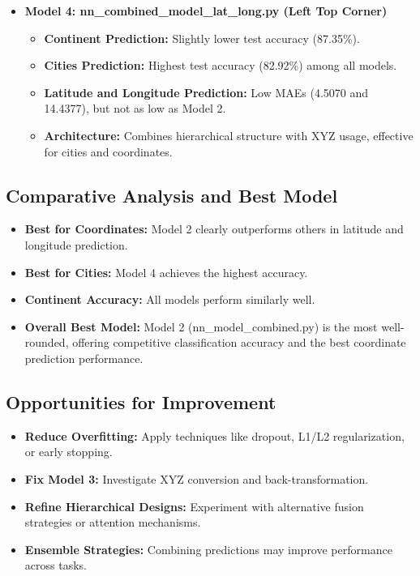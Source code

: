 \documentclass{article}
\begin{document}
\begin{itemize}
    \item \textbf{Model 4: nn\_combined\_model\_lat\_long.py (Left Top Corner)}
    \begin{itemize}
        \item \textbf{Continent Prediction:} Slightly lower test accuracy (87.35\%).
        \item \textbf{Cities Prediction:} Highest test accuracy (82.92\%) among all models.
        \item \textbf{Latitude and Longitude Prediction:} Low MAEs (4.5070 and 14.4377), but not as low as Model 2.
        \item \textbf{Architecture:} Combines hierarchical structure with XYZ usage, effective for cities and coordinates.
    \end{itemize}
\end{itemize}

\subsection*{Comparative Analysis and Best Model}
\begin{itemize}
    \item \textbf{Best for Coordinates:} Model 2 clearly outperforms others in latitude and longitude prediction.
    \item \textbf{Best for Cities:} Model 4 achieves the highest accuracy.
    \item \textbf{Continent Accuracy:} All models perform similarly well.
    \item \textbf{Overall Best Model:} Model 2 (nn\_model\_combined.py) is the most well-rounded, offering competitive classification accuracy and the best coordinate prediction performance.
\end{itemize}

\subsection*{Opportunities for Improvement}
\begin{itemize}
    \item \textbf{Reduce Overfitting:} Apply techniques like dropout, L1/L2 regularization, or early stopping.
    \item \textbf{Fix Model 3:} Investigate XYZ conversion and back-transformation.
    \item \textbf{Refine Hierarchical Designs:} Experiment with alternative fusion strategies or attention mechanisms.
    \item \textbf{Ensemble Strategies:} Combining predictions may improve performance across tasks.
\end{itemize}
\end{document}
